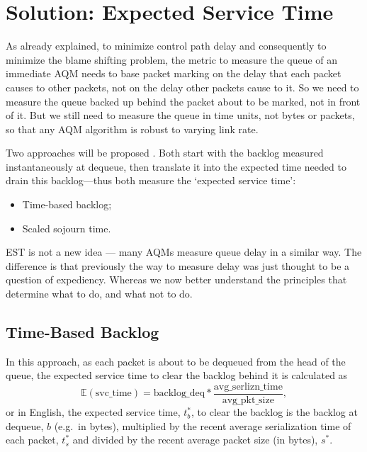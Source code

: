 \section{Solution: Expected Service Time}\label{sec:exp_svc_time}

As already explained, to minimize control path delay and consequently to minimize the blame shifting problem, the metric to measure the queue of an immediate AQM needs to base packet marking on the delay that each packet causes to other packets, not on the delay other packets cause to it. So we need to measure the queue backed up behind the packet about to be marked, not in front of it. But we still need to measure the queue in time units, not bytes or packets, so that any AQM algorithm is robust to varying link rate.

Two approaches will be proposed . Both start with the backlog measured instantaneously at dequeue, then translate it into the expected time needed to drain this backlog---thus both measure the `expected service time':
\begin{itemize}[nosep]
	\item Time-based backlog;
	\item Scaled sojourn time.
\end{itemize}

EST is not a new idea --- many AQMs measure queue delay in a similar way. The difference is that previously the way to measure delay was just thought to be a question of expediency. Whereas we now better understand the principles that determine what to do, and what not to do.

\subsection{Time-Based Backlog}\label{sec:time-based_backlog}

In this approach, as each packet is about to be dequeued from the head of the queue, the expected service time to clear the backlog behind it is calculated as
\[\mathbb{E}(\mathrm{svc\_time}) = \mathrm{backlog\_deq} * \frac{\mathrm{avg\_serlizn\_time}}{\mathrm{avg\_pkt\_size}},\]
or in English, the expected service time, \(t_b^*\), to clear the backlog is the backlog at dequeue, \(b\) (e.g.\ in bytes), multiplied by the recent average serialization time of each packet, \(t_s^*\) and divided by the recent average packet size (in bytes), \(s^*\).


